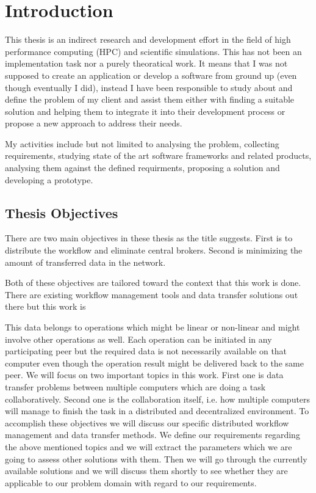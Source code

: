 \chapter{Introduction}
\label{cha:introduction}
This thesis is an indirect research and development effort in the field of high performance computing (HPC) and scientific simulations.
This has not been an implementation task nor a purely theoratical work. 
It means that I was not supposed to create an application or develop a software from ground up (even though eventually I did), instead
I have been responsible to study about and define the problem of my client and assist them either with 
finding a suitable solution and helping them to integrate it into their development process or propose a new approach to address their 
needs. 

My activities include but not limited to analysing the problem, collecting requirements,
studying state of the art software frameworks and related products,
analysing them against the defined requirments, proposing a solution and developing a prototype.

\section{Thesis Objectives}
There are two main objectives in these thesis as the title suggests. First is to distribute the workflow and eliminate central brokers.
Second is minimizing the amount of transferred data in the network. 

Both of these objectives are tailored toward the context that this work is done. There are existing workflow management tools
and data transfer solutions out there but this work is 

This data belongs to operations which might be linear or non-linear
and might involve other operations as well. Each operation can be initiated in any participating
peer but the required data is not necessarily available on that computer even though
the operation result might be delivered back to the same peer.
We will focus on two important topics in this work. First one is data transfer problems between multiple 
computers which are doing a task collaboratively. Second one is the collaboration itself, 
i.e. how multiple computers will manage to finish the task in a distributed and decentralized environment.
To accomplish these objectives we will discuss our specific distributed workflow management and data transfer methods. 
We define our requirements regarding the above mentioned topics and we will extract the parameters which we are going
to assess other solutions with them. Then we will go through the currently available solutions and we will discuss them shortly to see
whether they are applicable to our problem domain with regard to our requirements.

